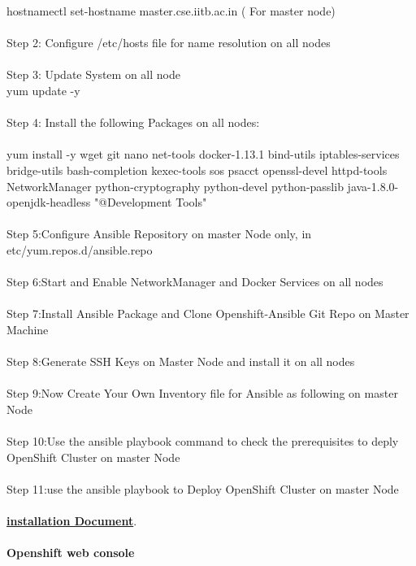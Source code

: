 \documentclass[11pt]{report}
\begin{document}
	hostnamectl set-hostname master.cse.iitb.ac.in ( For master node)
	\\
	\\
	Step 2: Configure /etc/hosts file for name resolution on all nodes
	\\
	\\
	Step 3: Update System on all node
	\\
	yum update -y
	\\
	\\
	Step 4: Install the following Packages on all nodes:  
	\\
	\\
	yum install -y wget git  nano net-tools docker-1.13.1 bind-utils iptables-services bridge-utils bash-completion kexec-tools sos psacct openssl-devel httpd-tools NetworkManager python-cryptography python-devel python-passlib java-1.8.0-openjdk-headless "@Development Tools"
	\\
	\\
	Step 5:Configure Ansible Repository on master Node only, in
	\\
	etc/yum.repos.d/ansible.repo
	\\
	\\
	Step 6:Start and Enable NetworkManager and Docker Services on all nodes
	\\
	\\
	Step 7:Install Ansible Package and Clone Openshift-Ansible Git Repo on Master Machine
	\\
	\\
	Step 8:Generate SSH Keys on Master Node and install it on all nodes
	\\
	\\
	Step 9:Now Create Your Own Inventory file for Ansible as following on master Node
	\\
	\\
	Step 10:Use the ansible playbook command to check the prerequisites to deply OpenShift Cluster on master Node
	\\
	\\
	Step 11:use the ansible playbook to Deploy OpenShift Cluster on master Node
	\\
	\\
	\textbf{ \href{https://docs.google.com/document/d/1-5IzdOLPmdm0L8KGBLJgSabSruhK_TCHPha0nX_jrXQ/edit?usp=sharing}{installation Document}}.
	\ \\
	\vspace{4cm}
	\ \\
	\textbf{Openshift web console}
	\ \\
\end{document}
